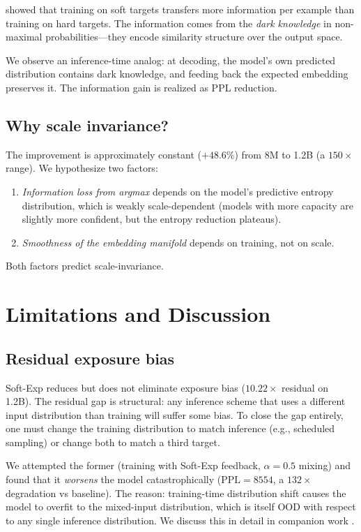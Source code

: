 \documentclass{article}
\begin{document}
\citet{hinton2015distill} showed that training on soft targets transfers more information per example than training on hard targets. The information comes from the \emph{dark knowledge} in non-maximal probabilities---they encode similarity structure over the output space.

We observe an inference-time analog: at decoding, the model's own predicted distribution contains dark knowledge, and feeding back the expected embedding preserves it. The information gain is realized as PPL reduction.

\subsection{Why scale invariance?}

The improvement is approximately constant ($+48.6\%$) from 8M to 1.2B (a $150\times$ range). We hypothesize two factors:
\begin{enumerate}
    \item \emph{Information loss from argmax} depends on the model's predictive entropy distribution, which is weakly scale-dependent (models with more capacity are slightly more confident, but the entropy reduction plateaus).
    \item \emph{Smoothness of the embedding manifold} depends on training, not on scale.
\end{enumerate}
Both factors predict scale-invariance.

\section{Limitations and Discussion}

\subsection{Residual exposure bias}

Soft-Exp reduces but does not eliminate exposure bias ($10.22\times$ residual on 1.2B). The residual gap is structural: any inference scheme that uses a different input distribution than training will suffer some bias. To close the gap entirely, one must change the training distribution to match inference (e.g., scheduled sampling) or change both to match a third target.

We attempted the former (training with Soft-Exp feedback, $\alpha=0.5$ mixing) and found that it \emph{worsens} the model catastrophically ($\mathrm{PPL} = 8554$, a $132\times$ degradation vs baseline). The reason: training-time distribution shift causes the model to overfit to the mixed-input distribution, which is itself OOD with respect to any single inference distribution. We discuss this in detail in companion work \citep{wang2026failed}.
\end{document}
